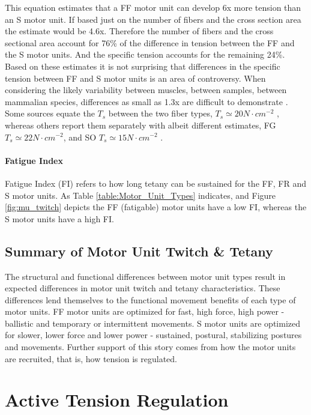 This equation estimates that a FF motor unit can develop 6x more tension than an S motor unit. If based just on the number of fibers and the cross section area the estimate would be 4.6x. Therefore the number of fibers and the cross sectional area account for 76\% of the difference in tension between the FF and the S motor units. And the specific tension accounts for the remaining 24\%. Based on these estimates it is not surprising that differences in the specific tension between FF and S motor units is an area of controversy. When considering the likely variability between muscles, between samples, between mammalian species, differences as small as 1.3x are difficult to demonstrate \cite{lieber_skeletal_2010}. Some sources equate the $T_s$ between the two fiber types, $T_s \simeq 20 N \cdot cm^{-2}$ \cite{feher_quantitative_2017}, whereas others report them separately with albeit different estimates, FG $T_s \simeq 22 N \cdot cm^{-2}$, and SO $T_s \simeq 15 N \cdot cm^{-2}$ \cite{lieber_skeletal_2010}.

\paragraph{Fatigue Index}
Fatigue Index (FI) refers to how long tetany can be sustained for the FF, FR and S motor units. As Table \ref{table:Motor_Unit_Types} indicates, and Figure \ref{fig:mu_twitch} depicts the FF (fatigable) motor units have a low FI, whereas the S motor units have a high FI.

\subsection{Summary of Motor Unit Twitch \& Tetany}
The structural and functional differences between motor unit types result in expected differences in motor unit twitch and tetany characteristics. These differences lend themselves to the functional movement benefits of each type of motor units. FF motor units are optimized for fast, high force, high power - ballistic and temporary or intermittent movements. S motor units are optimized for slower, lower force and lower power - sustained, postural, stabilizing postures and movements. Further support of this story comes from how the motor units are recruited, that is, how tension is regulated.

\section{Active Tension Regulation}

